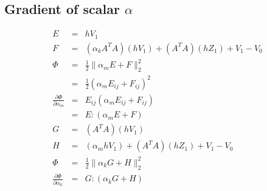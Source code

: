 \documentclass[9pt,twocolumn]{extarticle}
\begin{document}
\subsection{Gradient of scalar $\alpha$}
\begin{eqnarray*}
  E &=& hV_1 \\
  F &=& (\alpha_kA^TA)(hV_1) + (A^TA)(hZ_1)+V_1-V_0\\
  \Phi &=& \frac{1}{2}\| \alpha_mE + F \|_2^2 \\
  &=&\frac{1}{2}(\alpha_mE_{i{ }j}+F_{i{ }j})^2\\
  \frac{\partial{\Phi}}{\partial{\alpha_m}} &=&
  E_{i{ }j}(\alpha_mE_{i{ }j}+F_{i{ }j})\\
  &=&E:(\alpha_mE+F)\\
  G &=& (A^TA)(hV_1)\\
  H &=& (\alpha_mhV_1)+(A^TA)(hZ_1)+V_1-V_0\\
  \Phi &=& \frac{1}{2}\|\alpha_kG+H\|_2^2\\
  \frac{\partial{\Phi}}{\partial{\alpha_k}} &=&G:(\alpha_kG+H)
\end{eqnarray*}



\end{document}
